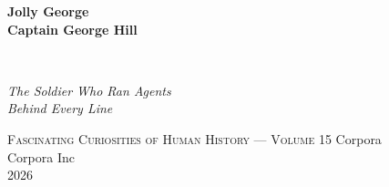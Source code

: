 \clearpage
\vspace*{1.5in}
\begin{center}
  \begin{minipage}{\textwidth}
    \centering
    \Huge\bfseries
    \linespread{1.25}\selectfont
    Jolly George\\[0.5em]
    Captain George Hill
  \end{minipage}
  \\[3em]
  {\Large\itshape\linespread{1.3}\selectfont
  The Soldier Who Ran Agents\\
  Behind Every Line\par}
  \vspace{2em}
  {\small\scshape Fascinating Curiosities of Human History — Volume 15}
  \vfill
  {\large Corpora}
  \\[1em]
  {\large Corpora Inc}
  \\[1em]
  {\large 2026}
\end{center}
\clearpage
